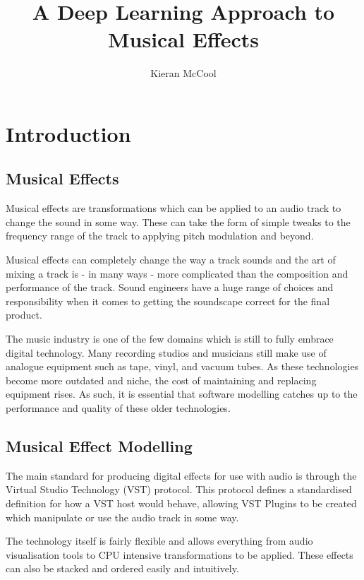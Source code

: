 \documentclass{l4proj}
\title{A Deep Learning Approach to Musical Effects}
\author{Kieran McCool}
\begin{document}
\maketitle

\tableofcontents
\chapter{Introduction}\label{introduction}

\section{Musical Effects}\label{musical-effects}

Musical effects are transformations which can be applied to an audio
track to change the sound in some way. These can take the form of simple
tweaks to the frequency range of the track to applying pitch modulation
and beyond.

Musical effects can completely change the way a track sounds and the art
of mixing a track is - in many ways - more complicated than the
composition and performance of the track. Sound engineers have a huge
range of choices and responsibility when it comes to getting the
soundscape correct for the final product.

The music industry is one of the few domains which is still to fully
embrace digital technology. Many recording studios and musicians still
make use of analogue equipment such as tape, vinyl, and vacuum tubes. As
these technologies become more outdated and niche, the cost of
maintaining and replacing equipment rises. As such, it is essential that
software modelling catches up to the performance and quality of these
older technologies.

\section{Musical Effect Modelling}\label{musical-effect-modelling}

The main standard for producing digital effects for use with audio is
through the Virtual Studio Technology (VST) protocol. This protocol
defines a standardised definition for how a VST host would behave,
allowing VST Plugins to be created which manipulate or use the audio
track in some way.

The technology itself is fairly flexible and allows everything from
audio visualisation tools to CPU intensive transformations to be
applied. These effects can also be stacked and ordered easily and
intuitively.
\end{document}
